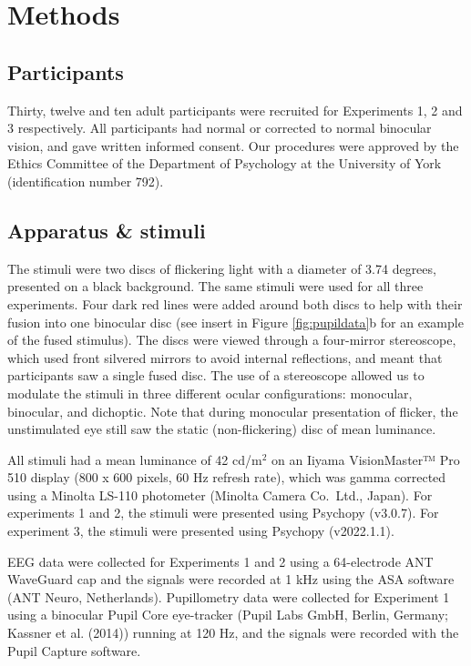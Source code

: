 \documentclass[
]{article}
\begin{document}
\hypertarget{methods}{%
\section{Methods}\label{methods}}

\hypertarget{participants}{%
\subsection{Participants}\label{participants}}

Thirty, twelve and ten adult participants were recruited for Experiments 1, 2 and 3 respectively. All participants had normal or corrected to normal binocular vision, and gave written informed consent. Our procedures were approved by the Ethics Committee of the Department of Psychology at the University of York (identification number 792).

\hypertarget{apparatus-stimuli}{%
\subsection{Apparatus \& stimuli}\label{apparatus-stimuli}}

The stimuli were two discs of flickering light with a diameter of 3.74 degrees, presented on a black background. The same stimuli were used for all three experiments. Four dark red lines were added around both discs to help with their fusion into one binocular disc (see insert in Figure \ref{fig:pupildata}b for an example of the fused stimulus). The discs were viewed through a four-mirror stereoscope, which used front silvered mirrors to avoid internal reflections, and meant that participants saw a single fused disc. The use of a stereoscope allowed us to modulate the stimuli in three different ocular configurations: monocular, binocular, and dichoptic. Note that during monocular presentation of flicker, the unstimulated eye still saw the static (non-flickering) disc of mean luminance.

All stimuli had a mean luminance of 42 cd/m\(^2\) on an Iiyama VisionMaster™ Pro 510 display (800 x 600 pixels, 60 Hz refresh rate), which was gamma corrected using a Minolta LS-110 photometer (Minolta Camera Co.~Ltd., Japan). For experiments 1 and 2, the stimuli were presented using Psychopy (v3.0.7). For experiment 3, the stimuli were presented using Psychopy (v2022.1.1).

EEG data were collected for Experiments 1 and 2 using a 64-electrode ANT WaveGuard cap and the signals were recorded at 1 kHz using the ASA software (ANT Neuro, Netherlands). Pupillometry data were collected for Experiment 1 using a binocular Pupil Core eye-tracker (Pupil Labs GmbH, Berlin, Germany; Kassner et al. (2014)) running at 120 Hz, and the signals were recorded with the Pupil Capture software.
\end{document}
